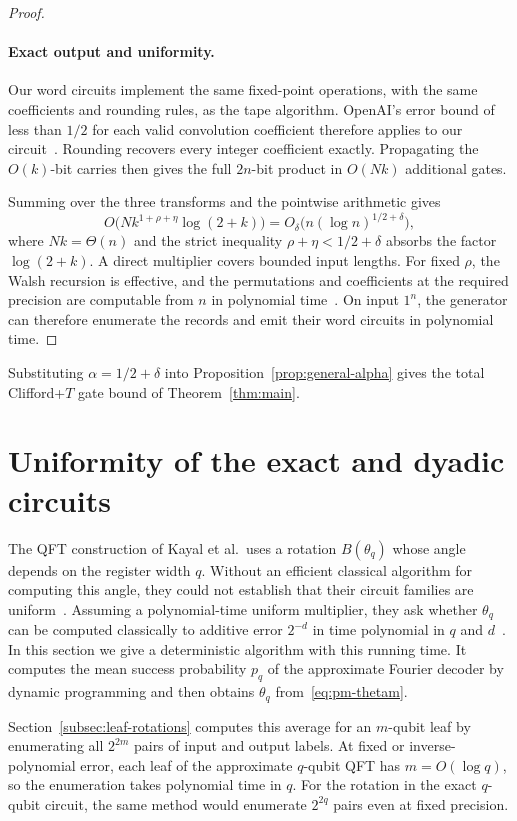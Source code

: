 \documentclass[11pt]{article}
\newcommand{\CFT}{Clifford+$T$}
\begin{document}
\begin{proof}
\paragraph{Exact output and uniformity.}
Our word circuits implement the same fixed-point operations, with the same coefficients and rounding rules, as the tape algorithm. OpenAI's error bound of less than $1/2$ for each valid convolution coefficient therefore applies to our circuit~\cite[Section~5.4]{openai2026mult}. Rounding recovers every integer coefficient exactly. Propagating the $O(k)$-bit carries then gives the full $2n$-bit product in $O(Nk)$ additional gates.

Summing over the three transforms and the pointwise arithmetic gives
\[
O\bigl(Nk^{1+\rho+\eta}\log(2+k)\bigr)=O_\delta\bigl(n(\log n)^{1/2+\delta}\bigr),
\]
where $Nk=\Theta(n)$ and the strict inequality $\rho+\eta<1/2+\delta$ absorbs the factor $\log(2+k)$. A direct multiplier covers bounded input lengths. For fixed $\rho$, the Walsh recursion is effective, and the permutations and coefficients at the required precision are computable from $n$ in polynomial time~\cite[Lemmas~4.1 and~5.2]{openai2026mult}. On input $1^n$, the generator can therefore enumerate the records and emit their word circuits in polynomial time.
\end{proof}

Substituting $\alpha=1/2+\delta$ into Proposition~\ref{prop:general-alpha} gives the total \CFT{} gate bound of Theorem~\ref{thm:main}.

\section{Uniformity of the exact and dyadic circuits}\label{sec:uniformity}

The QFT construction of Kayal et al.\ uses a rotation $B(\theta_q)$ whose angle depends on the register width $q$. Without an efficient classical algorithm for computing this angle, they could not establish that their circuit families are uniform~\cite{kmps2026}. Assuming a polynomial-time uniform multiplier, they ask whether $\theta_q$ can be computed classically to additive error $2^{-d}$ in time polynomial in $q$ and $d$~\cite[Section~5]{kmps2026}. In this section we give a deterministic algorithm with this running time. It computes the mean success probability $p_q$ of the approximate Fourier decoder by dynamic programming and then obtains $\theta_q$ from~\eqref{eq:pm-thetam}.

Section~\ref{subsec:leaf-rotations} computes this average for an $m$-qubit leaf by enumerating all $2^{2m}$ pairs of input and output labels. At fixed or inverse-polynomial error, each leaf of the approximate $q$-qubit QFT has $m=O(\log q)$, so the enumeration takes polynomial time in $q$. For the rotation in the exact $q$-qubit circuit, the same method would enumerate $2^{2q}$ pairs even at fixed precision.
\end{document}
